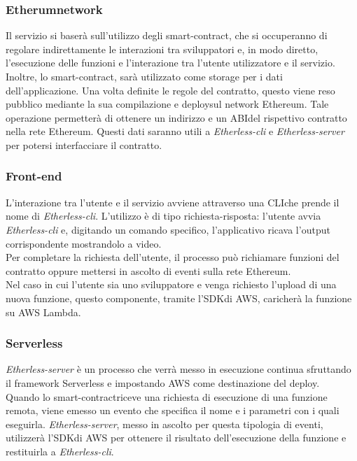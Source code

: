 \subsubsection{Etherum\glo network}
Il servizio si baserà sull'utilizzo degli smart-contract\glos, che si occuperanno di regolare indirettamente le interazioni tra sviluppatori e, in modo diretto, l'esecuzione delle funzioni e l'interazione tra l'utente utilizzatore e il servizio. Inoltre, lo smart-contract\glos, sarà utilizzato come storage per i dati dell'applicazione. Una volta definite le regole del contratto, questo viene reso pubblico mediante la sua compilazione e deploy\glo sul network Ethereum\glos. Tale operazione permetterà di ottenere un indirizzo e un ABI\glo del rispettivo contratto nella rete Ethereum\glos. Questi dati saranno utili a \textit{Etherless-cli} e \textit{Etherless-server} per potersi interfacciare il contratto.
\subsubsection{Front-end}
L'interazione tra l'utente e il servizio avviene attraverso una CLI\glo che prende il nome di \textit{Etherless-cli}. L'utilizzo è di tipo richiesta-risposta: l'utente avvia \textit{Etherless-cli} e, digitando un comando specifico, l'applicativo ricava l'output corrispondente mostrandolo a video. \\Per completare la richiesta dell'utente, il processo può richiamare funzioni del contratto oppure mettersi in ascolto di eventi sulla rete Ethereum\glos.
\\Nel caso in cui l'utente sia uno sviluppatore e venga richiesto l'upload di una nuova funzione, questo componente, tramite l'SDK\glo di AWS, caricherà la funzione su AWS Lambda\glos.
\subsubsection{Serverless}
\textit{Etherless-server} è un processo che verrà messo in esecuzione continua sfruttando il framework Serverless e impostando AWS come destinazione del deploy\glos.\\
Quando lo smart-contract\glo riceve una richiesta di esecuzione di una funzione remota, viene emesso un evento che specifica il nome e i parametri con i quali eseguirla. \textit{Etherless-server}, messo in ascolto per questa tipologia di eventi, utilizzerà l'SDK\glo di AWS per ottenere il risultato dell'esecuzione della funzione e restituirla a \textit{Etherless-cli}.

